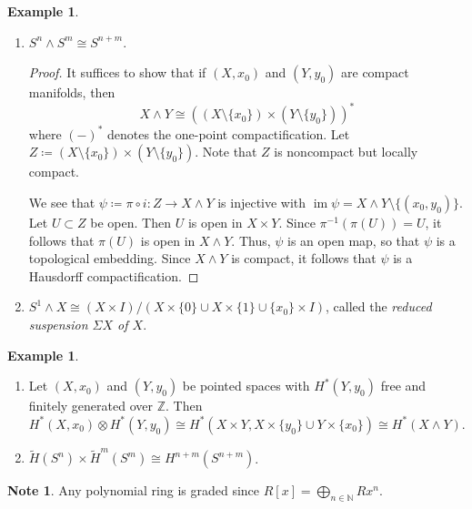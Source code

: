\documentclass[10pt,letterpaper,cm]{nupset}
\theoremstyle{definition}
\newtheorem{exmp}[definition]{Example}
\newtheorem{note}[definition]{Note}
\theoremstyle{theorem}
\theoremstyle{remark}
\newcommand{\N}{\mathbb N}
\newcommand{\Z}{\mathbb Z}
\newcommand{\1}{\mathbb{1}}
\newcommand{\0}{\vec 0}
\DeclareMathOperator{\im}{im}
\begin{document}
\begin{exmp} $ $
\begin{enumerate}
\item $S^n \wedge  S^m \cong S^{n+m}$.
\begin{proof}
 It suffices to show that if $\left(X, x_0\right)$ and $\left(Y, y_0\right)$ are compact manifolds, then $$X \wedge Y \cong \left(\left(X \setminus \{x_0\}\right) \times \left(Y \setminus \{y_0\}\right)\right)^{\ast}$$ where $({-})^{\ast}$ denotes the one-point compactification. Let $Z\coloneqq  \left(X \setminus \{x_0\}\right) \times \left(Y \setminus \{y_0\}\right)$. Note that $Z$ is noncompact but locally compact. 
 
 We see that $\psi \coloneqq  \pi \circ i : Z \to X \wedge Y$ is injective with $\im{\psi} = X \wedge Y \setminus \{(x_0, y_0)\}$. Let $U \subset Z$ be open. Then $U$ is open in $X \times Y$.  Since $\pi^{-1}(\pi(U)) = U$, it follows that $\pi(U)$ is open in $X \wedge Y$. Thus, $\psi$ is an open map, so that $\psi$ is a topological embedding. Since $X \wedge Y$ is compact, it follows that $\psi$ is a Hausdorff compactification. 
\end{proof}
\item $S^1 \wedge X \cong \left(X\times I\right)/\left(X\times \{0\}\cup X\times \{1\}\cup \{x_{0}\}\times I\right)$, called the \textit{reduced suspension $\Sigma{X}$ of $X$}.
\end{enumerate}
\end{exmp}

\begin{exmp} $ $
\begin{enumerate}
\item Let $\left(X, x_0\right)$ and $\left(Y, y_0\right)$ be pointed spaces with $H^{\ast}\left(Y, y_0\right)$ free and finitely generated over $\Z$. Then $H^{\ast}\left(X, x_0\right) \otimes H^{\ast}\left(Y, y_0\right) \cong H^{\ast}(X \times Y, X \times \{y_0\} \cup Y \times \{x_0\}) \cong H^{\ast}(X \wedge Y)    .$
\item  $\widetilde{H}(S^n) \times \widetilde{H}^m(S^m) \cong H^{n+m}(S^{n+m})$.
\end{enumerate}
\end{exmp}

\bigskip

\begin{note}
Any polynomial ring is graded since $R[x] = \bigoplus_{n \in \N} Rx^n$.
\end{note}
\end{document}
